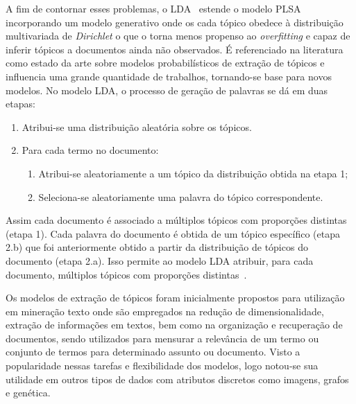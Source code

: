A fim de contornar esses problemas, o LDA~\cite{Blei2003} estende o modelo PLSA incorporando um modelo generativo onde os cada tópico obedece à distribuição multivariada de \textit{Dirichlet} o que o torna menos propenso ao \textit{overfitting} e capaz de inferir tópicos a documentos ainda não observados. É referenciado na literatura como estado da arte sobre modelos probabilísticos de extração de tópicos e influencia uma grande quantidade de trabalhos, tornando-se base para novos modelos. No modelo LDA, o processo de geração de palavras se dá em duas etapas:

\begin{enumerate}
	\item Atribui-se uma distribuição aleatória sobre os tópicos.
	\item Para cada termo no documento:
		\begin{enumerate}
			\item Atribui-se aleatoriamente a um tópico da distribuição obtida na etapa 1;
			\item Seleciona-se aleatoriamente uma palavra do tópico correspondente.
		\end{enumerate}
\end{enumerate}

Assim cada documento é associado a múltiplos tópicos com proporções distintas (etapa 1). Cada palavra do documento é obtida de um tópico específico (etapa 2.b) que foi anteriormente obtido a partir da distribuição de tópicos do documento (etapa 2.a). Isso permite ao modelo LDA atribuir, para cada documento, múltiplos tópicos com proporções distintas~\cite{Blei2012}.

Os modelos de extração de tópicos foram inicialmente propostos para utilização em mineração texto onde são empregados na redução de dimensionalidade, extração de informações em textos, bem como na organização e recuperação de documentos, sendo utilizados para mensurar a relevância de um termo ou conjunto de termos para determinado assunto ou documento. Visto a popularidade nessas tarefas e flexibilidade dos modelos, logo notou-se sua utilidade em outros tipos de dados com atributos discretos como imagens, grafos e genética. 


